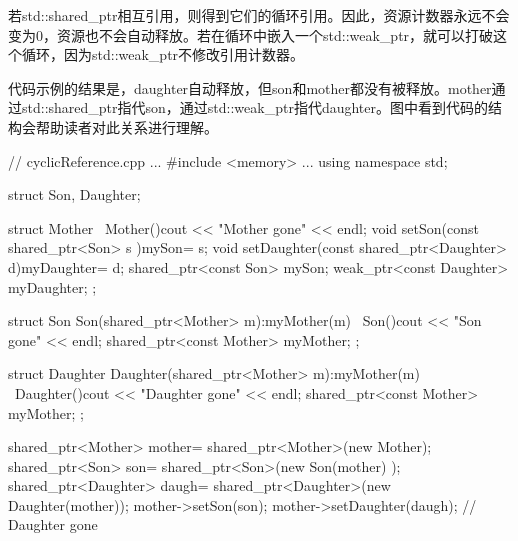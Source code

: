 若std::shared\_ptr相互引用，则得到它们的循环引用。因此，资源计数器永远不会变为0，资源也不会自动释放。若在循环中嵌入一个std::weak\_ptr，就可以打破这个循环，因为std::weak\_ptr不修改引用计数器。

代码示例的结果是，daughter自动释放，但son和mother都没有被释放。mother通过std::shared\_ptr指代son，通过std::weak\_ptr指代daughter。图中看到代码的结构会帮助读者对此关系进行理解。



\begin{cpp}
// cyclicReference.cpp
...
#include <memory>
...
using namespace std;

struct Son, Daughter;

struct Mother{
	~Mother(){cout << "Mother gone" << endl;}
	void setSon(const shared_ptr<Son> s ){mySon= s;}
	void setDaughter(const shared_ptr<Daughter> d){myDaughter= d;}
	shared_ptr<const Son> mySon;
	weak_ptr<const Daughter> myDaughter;
};

struct Son{
	Son(shared_ptr<Mother> m):myMother(m){}
	~Son(){cout << "Son gone" << endl;}
	shared_ptr<const Mother> myMother;
};

struct Daughter{
	Daughter(shared_ptr<Mother> m):myMother(m){}
	~Daughter(){cout << "Daughter gone" << endl;}
	shared_ptr<const Mother> myMother;
};

{
	shared_ptr<Mother> mother= shared_ptr<Mother>(new Mother);
	shared_ptr<Son> son= shared_ptr<Son>(new Son(mother) );
	shared_ptr<Daughter> daugh= shared_ptr<Daughter>(new Daughter(mother));
	mother->setSon(son);
	mother->setDaughter(daugh);
}
// Daughter gone
\end{cpp}


